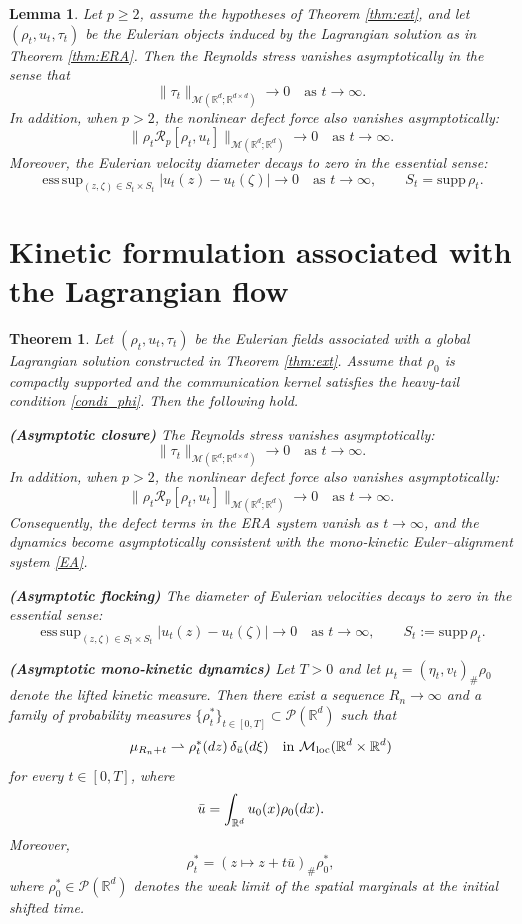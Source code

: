 \documentclass[10pt,a4paper]{amsart}
\newtheorem{theorem}{Theorem}
\newtheorem{lemma}{Lemma}
\newcommand{\R}{\mathbb R}
\newcommand{\calM}{\mathcal M}
\newcommand{\calP}{\mathcal P}
\newcommand{\calR}{\mathcal R}
\DeclareMathOperator*{\esssup}{ess\,sup}
\renewcommand{\geq}{\geqslant}
\newcommand{\intr}{\int_{\R^d}}
\newcommand{\rd}{\textnormal{d}}
\begin{document}
\begin{lemma}\label{lem:asymp_closure}
Let $p \geq 2$, assume the hypotheses of Theorem \ref{thm:ext}, and let $(\rho_t,u_t,\tau_t)$ be the Eulerian objects induced by the Lagrangian solution as in Theorem \ref{thm:ERA}. Then the Reynolds stress vanishes asymptotically in the sense that
\[
\|\tau_t\|_{\calM(\R^d;\R^{d\times d})} \to 0 \quad \text{as }t\to\infty.
\]
In addition, when $p>2$, the nonlinear defect force also vanishes asymptotically:
\[
\|\rho_t \calR_p[\rho_t,u_t]\|_{\calM(\R^d;\R^d)} \to 0 \quad \text{as }t\to\infty.
\]
Moreover, the Eulerian velocity diameter decays to zero in the essential sense:
\[
\esssup_{(z,\zeta)\in S_t\times S_t}|u_t(z)-u_t(\zeta)|
\to 0 \quad \text{as }t\to\infty, \qquad S_t=\text{supp}\,\rho_t.
\]
\end{lemma}

\section{Kinetic formulation associated with the Lagrangian flow}\label{app:kinetic}

\begin{theorem} \label{thm:asymp_closure}
Let $(\rho_t,u_t,\tau_t)$ be the Eulerian fields associated with a global  Lagrangian solution constructed in Theorem \ref{thm:ext}.  Assume that $\rho_0$ is compactly supported and the communication kernel satisfies the heavy-tail condition \eqref{condi_phi}. Then the following hold.

\medskip
\noindent
\textbf{(Asymptotic closure)} The Reynolds stress vanishes asymptotically:
\[
\|\tau_t\|_{\calM(\R^d;\R^{d\times d})}\to0 \quad\text{as }t\to\infty.
\]
In addition, when $p>2$, the nonlinear defect force also vanishes asymptotically:
\[
\|\rho_t \calR_p[\rho_t,u_t]\|_{\calM(\R^d;\R^d)}\to0 \quad\text{as }t\to\infty.
\]
Consequently, the defect terms in the ERA system vanish as $t\to\infty$, and the dynamics become asymptotically consistent with the mono-kinetic Euler--alignment system \eqref{EA}.


\medskip
\noindent
\textbf{(Asymptotic flocking)} The diameter of Eulerian velocities decays to zero in the essential sense:
\[
\esssup_{(z,\zeta)\in S_t\times S_t}|u_t(z)-u_t(\zeta)|
\to 0 \quad \text{as }t\to\infty, \qquad S_t :=\text{supp}\,\rho_t.
\]



\medskip
\noindent
\textbf{(Asymptotic mono-kinetic dynamics)}
Let $T>0$ and let $\mu_t=(\eta_t,v_t)_\#\rho_0$ denote the lifted kinetic measure. Then there exist a sequence $R_n\to\infty$ and a family of probability measures $\{\rho_t^\ast\}_{t\in[0,T]}\subset\calP(\R^d)$ such that
\[
\mu_{R_n+t} \rightharpoonup \rho_t^\ast(\rd z)\,\delta_{\bar u}(\rd\xi) \quad
\text{in }\calM_{\mathrm{loc}}(\R^d\times\R^d)
\]
for every $t\in[0,T]$, where
\[
\bar u=\intr u_0(x)\rho_0(\rd x).
\]
Moreover,
\[
\rho_t^\ast=(z\mapsto z+t\bar u)_\#\rho_0^\ast,
\]
where $\rho_0^\ast\in\mathcal P(\R^d)$ denotes the weak limit of the spatial marginals at the initial shifted time.
\end{theorem}
\end{document}
